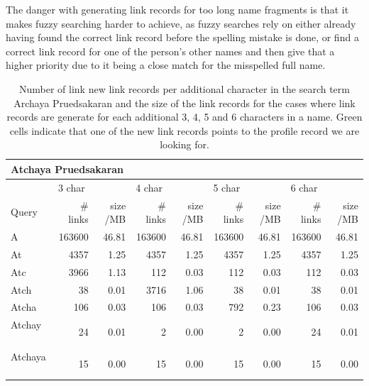 The danger with generating link records for too long name fragments is that it makes fuzzy searching harder to achieve, as fuzzy searches rely on either already having found the correct link record before the spelling mistake is done, or find a correct link record for one of the person's other names and then give that a higher priority due to it being a close match for the misspelled full name.

\begin{table}[!htb]
\caption{Number of link new link records per additional character in the search term Archaya Pruedsakaran and the size of the link records for the cases where link records are generate for each additional 3, 4, 5 and 6 characters in a name. Green cells indicate that one of the new link records points to the profile record we are looking for.}
\begin{center}
\scriptsize{
  \begin{tabular}{ | l | r | r | r | r | r | r | r | r | }
    \hline                       
    \multicolumn{9}{|l|}{\textbf{Atchaya Pruedsakaran}} \\ 
    \hline                       
    \hline  
    & \multicolumn{2}{l|}{3 char} & \multicolumn{2}{l|}{4 char} & \multicolumn{2}{l|}{5 char} & \multicolumn{2}{l|}{6 char}  \\
    Query & \# links & size /MB & \# links & size /MB & \# links & size /MB & \# links & size /MB  \\
    \hline  
    A                         & 163600 & 46.81 & 163600 & 46.81 & 163600 & 46.81 & 163600 & 46.81 \\
    \hline                   
    At                        & 4357 & 1.25 & 4357 & 1.25 & 4357 & 1.25 & 4357 & 1.25 \\
    \hline                   
    Atc                       & \cellcolor{green} 3966 & 1.13 & 112 & 0.03 & 112 & 0.03 & 112 & 0.03 \\
    \hline                   
    Atch                      & 38 & 0.01 & \cellcolor{green} 3716 & 1.06 & 38 & 0.01 & 38 & 0.01 \\
    \hline                   
    Atcha                     & 106 & 0.03 & 106 & 0.03 & \cellcolor{green} 792 & 0.23 & 106 & 0.03 \\
    \hline                   
    Atchay                    & \cellcolor{green} 24 & 0.01 & 2 & 0.00 & 2 & 0.00 & \cellcolor{green} 24 & 0.01 \\
    \hline                   
    Atchaya                   & \cellcolor{green} 15 & 0.00 & \cellcolor{green} 15 & 0.00 & \cellcolor{green} 15 & 0.00 & \cellcolor{green} 15 & 0.00 \\

\end{tabular}}
\end{center}
\end{table}
